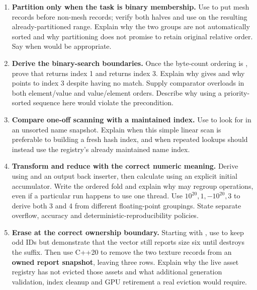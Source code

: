 \begin{enumerate}
\item
  \textbf{Partition only when the task is binary membership.} Use  to put mesh records before non-mesh records; verify both halves and use  on the resulting already-partitioned range. Explain why the two groups are not automatically sorted and why partitioning does not promise to retain original relative order. Say when  would be appropriate.
\item
  \textbf{Derive the binary-search boundaries.} Once the byte-count ordering is \BookInlineCode{{[}16,48,48,64,128{]}}, prove that  returns index 1 and  returns index 3. Explain why  gives \BookInlineCode{{[}1,3)} and why  points to index 3 despite having no match. Supply comparator overloads in both element/value and value/element orders. Describe why using a priority-sorted sequence here would violate the precondition.
\item
  \textbf{Compare one-off scanning with a maintained index.} Use  to look for  in an unsorted name snapshot. Explain when this simple linear scan is preferable to building a fresh hash index, and when repeated lookups should instead use the registry's already maintained name index.
\item
  \textbf{Transform and reduce with the correct numeric meaning.} Derive \BookInlineCode{{[}48,64,16,128,48{]}} using  and an output back inserter, then calculate  using an explicit  initial accumulator. Write the ordered  fold and explain why  may regroup operations, even if a particular run happens to use one thread. Use \(10^{20},1,-10^{20},3\) to derive both 3 and 4 from different floating-point groupings. State separate overflow, accuracy and deterministic-reproducibility policies.
\item
  \textbf{Erase at the correct ownership boundary.} Starting with , use  to keep odd IDs but demonstrate that the vector still reports size six until  destroys the suffix. Then use C++20  to remove the two texture records from an \textbf{owned report snapshot}, leaving three rows. Explain why the live asset registry has not evicted those assets and what additional generation validation, index cleanup and GPU retirement a real eviction would require.
\end{enumerate}

